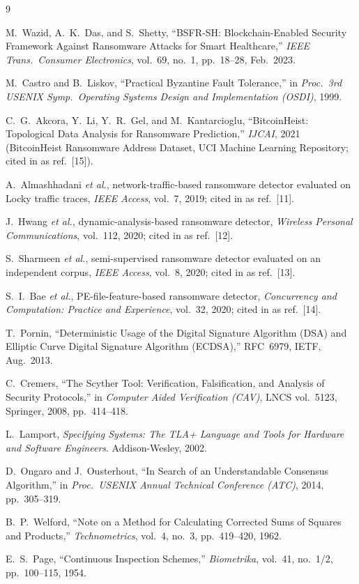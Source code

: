 \documentclass[conference]{IEEEtran}
\begin{document}
\begin{thebibliography}{9}

M.~Wazid, A.~K.~Das, and S.~Shetty, ``BSFR-SH: Blockchain-Enabled Security Framework Against
Ransomware Attacks for Smart Healthcare,'' \emph{IEEE Trans.\ Consumer Electronics}, vol.~69,
no.~1, pp.~18--28, Feb.\ 2023.

M.~Castro and B.~Liskov, ``Practical Byzantine Fault Tolerance,'' in \emph{Proc.\ 3rd USENIX
Symp.\ Operating Systems Design and Implementation (OSDI)}, 1999.

C.~G.~Akcora, Y.~Li, Y.~R.~Gel, and M.~Kantarcioglu, ``BitcoinHeist: Topological Data Analysis
for Ransomware Prediction,'' \emph{IJCAI}, 2021 (BitcoinHeist Ransomware Address Dataset, UCI
Machine Learning Repository; cited in \cite{wazid2023} as ref.~[15]).

A.~Almashhadani \emph{et al.}, network-traffic-based ransomware detector evaluated on Locky
traffic traces, \emph{IEEE Access}, vol.~7, 2019; cited in \cite{wazid2023} as ref.~[11].

J.~Hwang \emph{et al.}, dynamic-analysis-based ransomware detector, \emph{Wireless Personal
Communications}, vol.~112, 2020; cited in \cite{wazid2023} as ref.~[12].

S.~Sharmeen \emph{et al.}, semi-supervised ransomware detector evaluated on an independent
corpus, \emph{IEEE Access}, vol.~8, 2020; cited in \cite{wazid2023} as ref.~[13].

S.~I.~Bae \emph{et al.}, PE-file-feature-based ransomware detector, \emph{Concurrency and
Computation: Practice and Experience}, vol.~32, 2020; cited in \cite{wazid2023} as ref.~[14].

T.~Pornin, ``Deterministic Usage of the Digital Signature Algorithm (DSA) and Elliptic Curve
Digital Signature Algorithm (ECDSA),'' RFC~6979, IETF, Aug.\ 2013.

C.~Cremers, ``The Scyther Tool: Verification, Falsification, and Analysis of Security
Protocols,'' in \emph{Computer Aided Verification (CAV)}, LNCS vol.~5123, Springer, 2008,
pp.~414--418.

L.~Lamport, \emph{Specifying Systems: The TLA+ Language and Tools for Hardware and Software
Engineers}. Addison-Wesley, 2002.

D.~Ongaro and J.~Ousterhout, ``In Search of an Understandable Consensus Algorithm,'' in
\emph{Proc.\ USENIX Annual Technical Conference (ATC)}, 2014, pp.~305--319.

B.~P.~Welford, ``Note on a Method for Calculating Corrected Sums of Squares and Products,''
\emph{Technometrics}, vol.~4, no.~3, pp.~419--420, 1962.

E.~S.~Page, ``Continuous Inspection Schemes,'' \emph{Biometrika}, vol.~41, no.~1/2,
pp.~100--115, 1954.

\end{thebibliography}
\end{document}
